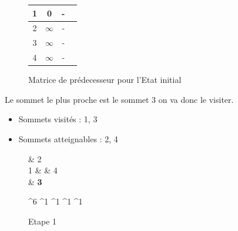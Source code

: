 \documentclass[a4paper,12pt,final] {article}
\begin{document}
\begin{figure}[htpd]
\begin{center}
\begin{tabular}{|c|c|c|c|}
\hline
 {\color{red} \bf 1} & 0 & - \\
\hline
2 & $\infty$ & - \\
\hline
3 & $\infty$ & - \\
\hline
4 & $\infty$ & - \\
\hline
\end{tabular}
\end{center}
\caption{Matrice de prédecesseur pour l'Etat initial}
\end{figure}
Le sommet le plus proche est le sommet 3 on va donc le visiter.
\begin{itemize}
\item Sommets visités : 1, 3
\item Sommets atteignables : 2, 4
\end{itemize}
\begin{figure}[htpd]
 \centering
 \begin{psmatrix}[mnode=circle]
	    & 2\\
	1 &    & 4\\
	    &  {\color{red} \bf 3}\\
\end{psmatrix}
	
	^{6}
	^{1}
	^{1}
	^{1}
	^{1}

  \caption{Etape 1}
\end{figure}
\end{document}
